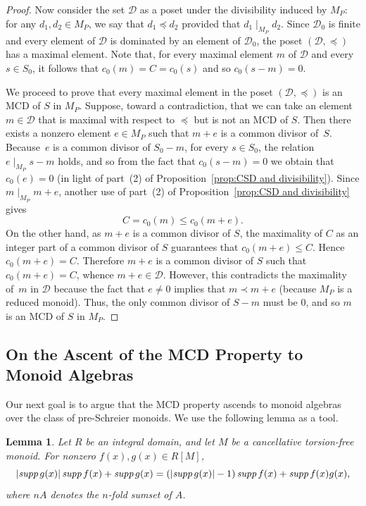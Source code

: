 \documentclass[10pt]{amsart}
\newtheorem{lemma}[theorem]{Lemma}
\theoremstyle{definition}
\theoremstyle{remark}
\numberwithin{equation}{section}
\begin{document}
\begin{proof}
  Now consider the set $\mathcal{D}$ as a poset under the divisibility induced by $M_P$: for any $d_1, d_2 \in M_P$, we say that $d_1 \preceq d_2$ provided that $d_1 \mid_{M_P} d_2$. Since $\mathcal{D}_0$ is finite and every element of $\mathcal{D}$ is dominated by an element of $\mathcal{D}_0$, the poset $(\mathcal{D}, \preceq)$ has a maximal element. Note that, for every maximal element $m$ of $\mathcal{D}$ and every $s \in S_0$, it follows that $c_0(m) = C = c_0(s)$ and so $c_0(s-m)=0$.

  We proceed to prove that every maximal element in the poset $(\mathcal{D}, \preceq)$ is an MCD of $S$ in $M_P$. Suppose, toward a contradiction, that we can take an element $m \in \mathcal{D}$ that is maximal with respect to $\preceq$ but is not an MCD of $S$. Then there exists a nonzero element $e \in M_P$ such that $m+e$ is a common divisor of~$S$. Because~$e$ is a common divisor of $S_0-m$, for every $s \in S_0$, the relation $e \mid_{M_P} s-m$ holds, and so from the fact that $c_0(s-m) = 0$ we obtain that $c_0(e) = 0$ (in light of part~(2) of Proposition~\ref{prop:CSD and divisibility}). Since $m \mid_{M_P} m+e$, another use of part~(2) of Proposition~\ref{prop:CSD and divisibility} gives
  \[
    C = c_0(m) \le c_0(m+e).
  \]
  On the other hand, as $m+e$ is a common divisor of $S$, the maximality of $C$ as an integer part of a common divisor of $S$ guarantees that $c_0(m+e) \le C$. Hence $c_0(m+e) = C$. Therefore $m+e$ is a common divisor of $S$ such that $c_0(m+e) = C$, whence $m+e \in \mathcal{D}$. However, this contradicts the maximality of~$m$ in $\mathcal{D}$ because the fact that $e\neq 0$ implies that $m \prec m+e$ (because $M_P$ is a reduced monoid). Thus, the only common divisor of $S-m$ must be $0$, and so $m$ is an MCD of $S$ in $M_P$.
\end{proof}




\smallskip
\subsection{On the Ascent of the MCD Property to Monoid Algebras}

Our next goal is to argue that the MCD property ascends to monoid algebras over the class of pre-Schreier monoids. We use the following lemma as a tool.

\begin{lemma}\cite[Proposition~6.2]{GP74} \label{lem:exponent sum condition}
Let $R$ be an integral domain, and let $M$ be a cancellative torsion-free monoid. For nonzero $f(x), g(x) \in R[M]$,
\[
  |\emph{supp} \, g(x)|\,\emph{supp} \, f(x)+\emph{supp} \, g(x) = (|\emph{supp} \, g(x)|-1)\,\emph{supp} \, f(x)+\emph{supp} \, f(x)g(x),
\]
where $nA$ denotes the $n$-fold sumset of $A$.
\end{lemma}
\end{document}

